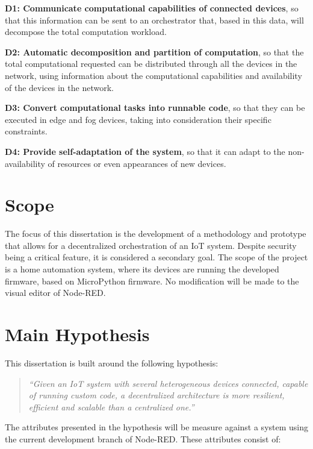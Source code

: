 \begin{description}
    \item \textbf{D1: Communicate computational capabilities of connected devices}, so that this information can be sent to an orchestrator that, based in this data, will decompose the total computation workload.
    \item \textbf{D2: Automatic decomposition and partition of computation}, so that the total computational requested can be distributed through all the devices in the network, using information about the computational capabilities and availability of the devices in the network.
    \item \textbf{D3: Convert computational tasks into runnable code}, so that they can be executed in edge and fog devices, taking into consideration their specific constraints.
    \item \textbf{D4: Provide self-adaptation of the system}, so that it can adapt to the non-availability of resources or even appearances of new devices.
\end{description}

\section{Scope}\label{sec:scope}

The focus of this dissertation is the development of a methodology and prototype that allows for a decentralized orchestration of an IoT system. Despite security being a critical feature, it is considered a secondary goal. The scope of the project is a home automation system, where its devices are running the developed firmware, based on MicroPython firmware. No modification will be made to the visual editor of Node-RED.

\section{Main Hypothesis}\label{sec:main_hypothesis}

This dissertation is built around the following hypothesis:

\begin{quote}
    \emph{``Given an IoT system with several heterogeneous devices connected, capable of running custom code, a decentralized architecture is more resilient, efficient and scalable than a centralized one.''}
\end{quote}

The attributes presented in the hypothesis will be measure against a system using the current development branch of Node-RED. These attributes consist of:

